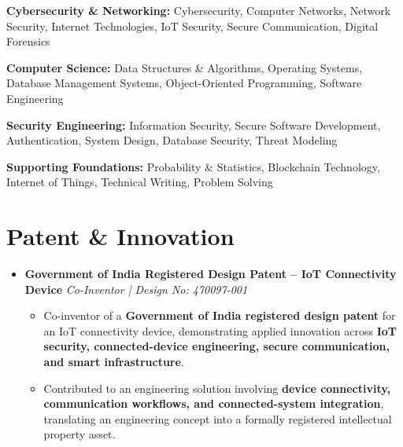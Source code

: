 \documentclass[a4paper,11pt]{article}
\newcommand{\resumeItem}[1]{
    \item \small{#1 \vspace{-2pt}}
}
\begin{document}
\begin{itemize}[leftmargin=0in, label={}]

\small{

\item{
\textbf{Cybersecurity \& Networking:} Cybersecurity, Computer Networks, Network Security, Internet Technologies, IoT Security, Secure Communication, Digital Forensics
}

\item{
\textbf{Computer Science:} Data Structures \& Algorithms, Operating Systems, Database Management Systems, Object-Oriented Programming, Software Engineering
}

\item{
\textbf{Security Engineering:} Information Security, Secure Software Development, Authentication, System Design, Database Security, Threat Modeling
}

\item{
\textbf{Supporting Foundations:} Probability \& Statistics, Blockchain Technology, Internet of Things, Technical Writing, Problem Solving
}

}

\end{itemize}

\vspace{-10pt}


\section{Patent \& Innovation}

\begin{itemize}[leftmargin=0in, label={}]

\item
\textbf{Government of India Registered Design Patent -- IoT Connectivity Device}
\hfill \textit{Co-Inventor | Design No: 470097-001}

\begin{itemize}[leftmargin=*]

\resumeItem{Co-inventor of a \textbf{Government of India registered design patent} for an IoT connectivity device, demonstrating applied innovation across \textbf{IoT security, connected-device engineering, secure communication, and smart infrastructure}.}

\resumeItem{Contributed to an engineering solution involving \textbf{device connectivity, communication workflows, and connected-system integration}, translating an engineering concept into a formally registered intellectual property asset.}

\end{itemize}

\end{itemize}

\vspace{-10pt}
\end{document}
